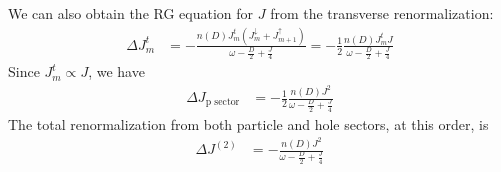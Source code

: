 \documentclass[reprint,prb,superscriptaddress]{revtex4-2}
\begin{document}
We can also obtain the RG equation for \(J\) from the transverse renormalization:
\begin{equation}\begin{aligned}
	\Delta J^t_m &= - \frac{n(D)J^t_m \left( J^\downarrow_m + J^\uparrow_{m+1} \right) }{\omega - \frac{D}{2} + \frac{J}{4}} = -\frac{1}{2}\frac{n(D)J^t_m J}{\omega - \frac{D}{2} + \frac{J}{4}}
\end{aligned}\end{equation}
Since \(J^t_m \propto J\), we have
\begin{equation}\begin{aligned}
	\Delta J_\text{p sector} &= -\frac{1}{2}\frac{n(D)J^2}{\omega - \frac{D}{2} + \frac{J}{4}}
\end{aligned}\end{equation}
The total renormalization from both particle and hole sectors, at this order, is
\begin{equation}\begin{aligned}
	\Delta J^{(2)} &= -\frac{n(D)J^2}{\omega - \frac{D}{2} + \frac{J}{4}}
\end{aligned}\end{equation}
\end{document}
